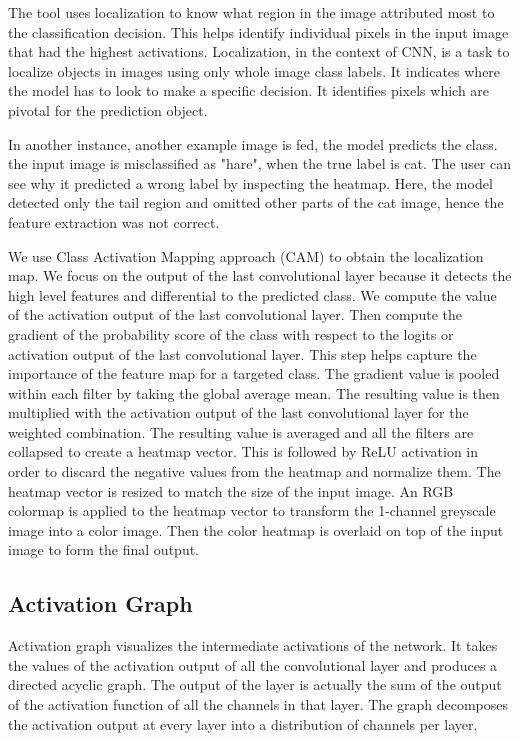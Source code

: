The tool uses localization to know what region in the image attributed most to the classification decision. This helps identify individual pixels in the input image that had the highest activations. Localization, in the context of CNN, is a task to localize objects in images using only whole image class labels. It indicates where the model has to look to make a specific decision. It identifies pixels which are pivotal for the prediction object.

In another instance, another example image is fed, the model predicts the class. the input image is misclassified as "hare", when the true label is cat. The user can see why it predicted a wrong label by inspecting the heatmap. Here, the model detected only the tail region and omitted other parts of the cat image, hence the feature extraction was not correct.

We use Class Activation Mapping approach (CAM) to obtain the localization map. We focus on the output of the last convolutional layer because it detects the high level features and differential to the predicted class. We compute the value of the activation output of the last convolutional layer. Then compute the gradient of the probability score of the class with respect to the logits or activation output of the last convolutional layer. This step helps capture the importance of the feature map for a targeted class. The gradient value is pooled within each filter by taking the global average mean. The resulting value is then multiplied with the activation output of the last convolutional layer for the weighted combination. The resulting value is averaged and all the filters are collapsed to create a heatmap vector. This is followed by ReLU activation in order to discard the negative values from the heatmap and normalize them. The heatmap vector is resized to match the size of the input image. An RGB colormap is applied to the heatmap vector to transform the 1-channel greyscale image into a color image. Then the color heatmap is overlaid on top of the input image to form the final output.

\subsection{Activation Graph}

Activation graph visualizes the intermediate activations of the network. It takes the values of the activation output of all the convolutional layer and produces a directed acyclic graph. The output of the layer is actually the sum of the output of the activation function of all the channels in that layer. The graph decomposes the activation output at every layer into a distribution of channels per layer.

